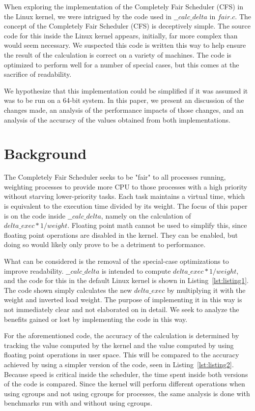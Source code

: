\documentclass[10pt, conference]{IEEEtran}
\begin{document}
When exploring the implementation of the Completely Fair Scheduler (CFS) in the Linux kernel, we were intrigued by the code used in $\_\_calc\_delta$ in $fair.c$.  The concept of the Completely Fair Scheduler (CFS) is deceptively simple.  The source code for this inside the Linux kernel appears, initially, far more complex than would seem necessary.  We suspected this code is written this way to help ensure the result of the calculation is correct on a variety of machines.  The code is optimized to perform well for a number of special cases, but this comes at the sacrifice of readability.

We hypothesize that this implementation could be simplified if it was assumed it was to be run on a 64-bit system.  In this paper, we present an discussion of the changes made, an analysis of the performance impacts of those changes, and an analysis of the accuracy of the values obtained from both implementations.  

\section{Background}
The Completely Fair Scheduler seeks to be "fair" to all processes running, weighting processes to provide more CPU to those processes with a high priority without starving lower-priority tasks.  Each task maintains a virtual time, which is equivalent to the execution time divided by its weight.  The focus of this paper is on the code inside $\_\_calc\_delta$, namely on the calculation of $delta\_exec * 1 / weight$.  Floating point math cannot be used to simplify this, since floating point operations are disabled in the kernel.  They can be enabled, but doing so would likely only prove to be a detriment to performance.

What can be considered is the removal of the special-case optimizations to improve readability.  $\_\_calc\_delta$ is intended to compute $delta\_exec * 1 / weight$, and the code for this in the default Linux kernel is shown in Listing~\ref{lst:listing1}.  The code shown simply calculates the new $delta\_exec$ by multiplying it with the weight and inverted load weight.  The purpose of implementing it in this way is not immediately clear and not elaborated on in detail.  We seek to analyze the benefits gained or lost by implementing the code in this way.

For the aforementioned code, the accuracy of the calculation is determined by tracking the value computed by the kernel and the value computed by using floating point operations in user space.  This will be compared to the accuracy achieved by using a simpler version of the code, seen in Listing~\ref{lst:listing2}.
Because speed is critical inside the scheduler, the time spent inside both versions of the code is compared.  Since the kernel will perform different operations when using cgroups and not using cgroups for processes, the same analysis is done with benchmarks run with and without using cgroups.
\end{document}
